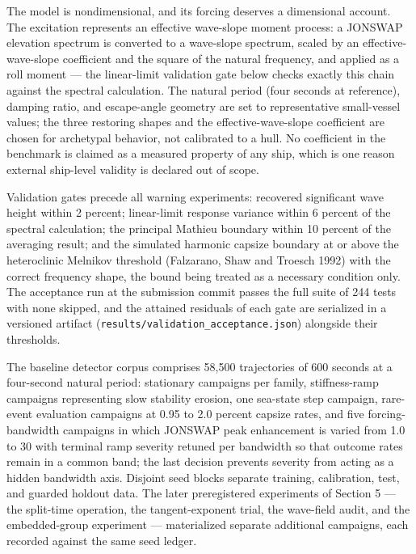 \documentclass[11pt]{article}
\begin{document}
The model is nondimensional, and its forcing deserves a dimensional account. The excitation
represents an effective wave-slope moment process: a JONSWAP elevation spectrum is converted to
a wave-slope spectrum, scaled by an effective-wave-slope coefficient and the square of the
natural frequency, and applied as a roll moment --- the linear-limit validation gate below checks
exactly this chain against the spectral calculation. The natural period (four seconds at
reference), damping ratio, and escape-angle geometry are set to representative small-vessel
values; the three restoring shapes and the effective-wave-slope coefficient are chosen for
archetypal behavior, not calibrated to a hull. No coefficient in the benchmark is claimed as a
measured property of any ship, which is one reason external ship-level validity is declared out
of scope.

Validation gates precede all warning experiments: recovered significant wave height within 2
percent; linear-limit response variance within 6 percent of the spectral calculation; the
principal Mathieu boundary within 10 percent of the averaging result; and the simulated harmonic
capsize boundary at or above the heteroclinic Melnikov threshold (Falzarano, Shaw and Troesch
1992) with the correct frequency shape, the bound being treated as a necessary condition only.
The acceptance run at the submission commit passes the full suite of 244 tests with none
skipped, and the attained residuals of each gate are serialized in a versioned artifact
(\texttt{results/validation\_acceptance.json}) alongside their thresholds.

The baseline detector corpus comprises 58,500 trajectories of 600 seconds at a four-second
natural period:
stationary campaigns per family, stiffness-ramp campaigns representing slow stability erosion,
one sea-state step campaign, rare-event evaluation campaigns at 0.95 to 2.0 percent capsize
rates, and five forcing-bandwidth campaigns in which JONSWAP peak enhancement is varied from 1.0
to 30 with terminal ramp severity retuned per bandwidth so that outcome rates remain in a common
band; the last decision prevents severity from acting as a hidden bandwidth axis. Disjoint seed
blocks separate training, calibration, test, and guarded holdout data. The later preregistered
experiments of Section 5 --- the split-time operation, the tangent-exponent trial, the wave-field
audit, and the embedded-group experiment --- materialized separate additional campaigns, each
recorded against the same seed ledger.
\end{document}

